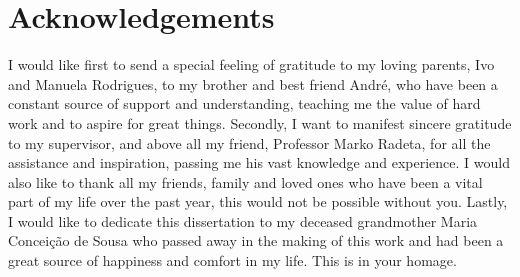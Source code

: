 \chapter*{Acknowledgements}

I would like first to send a special feeling of gratitude to my loving parents, Ivo and Manuela Rodrigues, to my brother and best friend André, who have been a constant source of support and understanding, teaching me the value of hard work and to aspire for great things.
Secondly, I want to manifest sincere gratitude to my supervisor, and above all my friend, Professor Marko Radeta, for all the assistance and inspiration, passing me his vast knowledge and experience.
I would also like to thank all my friends, family and loved ones who have been a vital part of my life over the past year, this would not be possible without you.
Lastly, I would like to dedicate this dissertation to my deceased grandmother Maria Conceição de Sousa who passed away in the making of this work and had been a great source of happiness and comfort in my life. This is in your homage.

